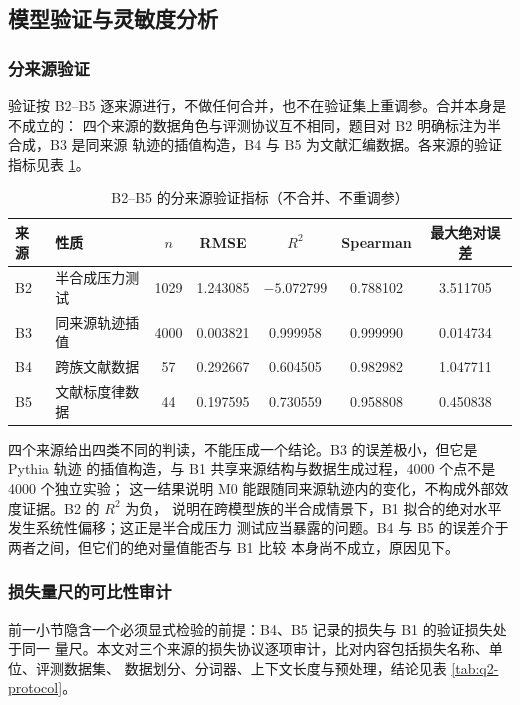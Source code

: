 \documentclass[bwprint]{gmcmthesis}
\numberwithin{equation}{section}
\numberwithin{figure}{section}
\numberwithin{table}{section}
\begin{document}
\subsection{模型验证与灵敏度分析}\label{sec:q2-sens}

\subsubsection{分来源验证}

验证按 B2--B5 逐来源进行，不做任何合并，也不在验证集上重调参。合并本身是不成立的：
四个来源的数据角色与评测协议互不相同，题目对 B2 明确标注为半合成，B3 是同来源
轨迹的插值构造，B4 与 B5 为文献汇编数据。各来源的验证指标见表
\ref{tab:q2-val}。

\begin{table}[htp!]
\centering
\renewcommand\arraystretch{1.2}
\caption{B2--B5 的分来源验证指标（不合并、不重调参）}\label{tab:q2-val}
\begin{tabular*}{\textwidth}{@{\extracolsep{\fill}}llccccc@{}}
\toprule
来源 & 性质 & $n$ & RMSE & $R^2$ & Spearman & 最大绝对误差 \\
\midrule
B2 & 半合成压力测试 & 1029 & 1.243085 & $-5.072799$ & 0.788102 & 3.511705 \\
B3 & 同来源轨迹插值 & 4000 & 0.003821 & 0.999958 & 0.999990 & 0.014734 \\
B4 & 跨族文献数据 & 57 & 0.292667 & 0.604505 & 0.982982 & 1.047711 \\
B5 & 文献标度律数据 & 44 & 0.197595 & 0.730559 & 0.958808 & 0.450838 \\
\bottomrule
\end{tabular*}
\end{table}

四个来源给出四类不同的判读，不能压成一个结论。B3 的误差极小，但它是 Pythia 轨迹
的插值构造，与 B1 共享来源结构与数据生成过程，4000 个点不是 4000 个独立实验；
这一结果说明 M0 能跟随同来源轨迹内的变化，不构成外部效度证据。B2 的 $R^2$ 为负，
说明在跨模型族的半合成情景下，B1 拟合的绝对水平发生系统性偏移；这正是半合成压力
测试应当暴露的问题。B4 与 B5 的误差介于两者之间，但它们的绝对量值能否与 B1 比较
本身尚不成立，原因见下。

\subsubsection{损失量尺的可比性审计}

前一小节隐含一个必须显式检验的前提：B4、B5 记录的损失与 B1 的验证损失处于同一
量尺。本文对三个来源的损失协议逐项审计，比对内容包括损失名称、单位、评测数据集、
数据划分、分词器、上下文长度与预处理，结论见表 \ref{tab:q2-protocol}。
\end{document}
